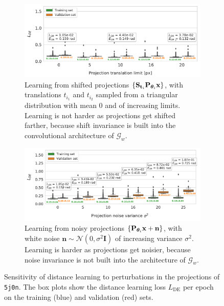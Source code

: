 \begin{figure}[ht!]
    \centering
    \begin{subfigure}[t]{0.47\linewidth}
        \includegraphics[width=\linewidth]{figures/de_translation_nums}
        \caption{%
            Learning from shifted projections $\{ \mathbf{S}_{\mathbf{t}_i} \mathbf{P}_{{\boldsymbol{\theta}}_i} \mathbf{x} \}$, with translations $t_{i_1}$ and $t_{i_2}$ sampled from a triangular distribution with mean 0 and of increasing limits.
            Learning is not harder as projections get shifted farther, because shift invariance is built into the convolutional architecture of $\mathcal{G}_w$.
    }\label{fig:results:distance-estimation:shift}
    \end{subfigure}
    \hfill
    \begin{subfigure}[t]{0.47\linewidth}
        \includegraphics[width=\linewidth]{figures/de_noises_nums}
        \caption{%
            Learning from noisy projections $\{ \mathbf{P}_{{\boldsymbol{\theta}}_i} \mathbf{x} + \mathbf{n} \}$, with white noise $\mathbf{n} \sim \mathcal{N}(0, \sigma^2\mathbf{I})$ of increasing variance $\sigma^2$.
            Learning is harder as projections get noisier, because noise invariance is not built into the architecture of $\mathcal{G}_w$.
        }\label{fig:results:distance-estimation:noise}
    \end{subfigure}
    \caption{%
        Sensitivity of distance learning to perturbations in the projections of \texttt{5j0n}.
        The box plots show the distance learning loss $L_\text{DE}$ per epoch  on the training (blue) and validation (red) sets.
}
\end{figure}
